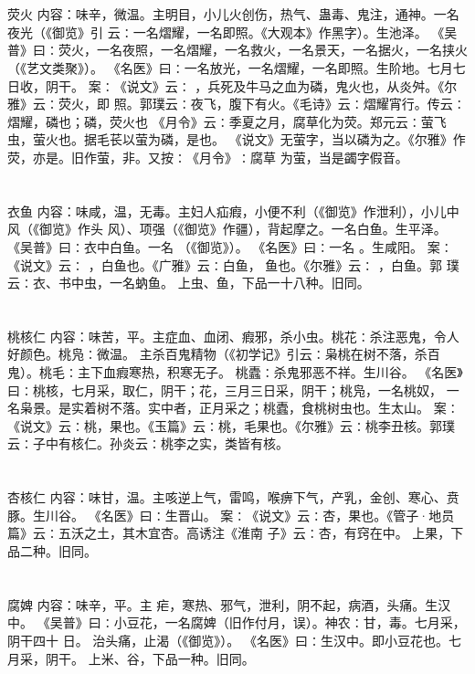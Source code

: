 \documentclass[12pt,UTF8]{ctexbook}
\begin{document}
\section{}荧火
内容：味辛，微温。主明目，小儿火创伤，热气、蛊毒、鬼注，通神。一名夜光（《御览》引 
云∶一名熠耀，一名即照。《大观本》作黑字）。生池泽。 
《吴普》曰∶荧火，一名夜照，一名熠耀，一名救火，一名景天，一名据火，一名挟火 
（《艺文类聚》）。 
《名医》曰∶一名放光，一名熠耀，一名即照。生阶地。七月七日收，阴干。 
案∶《说文》云∶ ，兵死及牛马之血为磷，鬼火也，从炎舛。《尔雅》云∶荧火，即 
照。郭璞云∶夜飞，腹下有火。《毛诗》云∶熠耀宵行。传云∶熠耀，磷也；磷，荧火也 
《月令》云∶季夏之月，腐草化为荧。郑元云∶萤飞虫，萤火也。据毛苌以萤为磷，是也。 
《说文》无萤字，当以磷为之。《尔雅》作荧，亦是。旧作萤，非。又按∶《月令》∶腐草 
为萤，当是蠲字假音。 


\section{}衣鱼
内容：味咸，温，无毒。主妇人疝瘕，小便不利（《御览》作泄利），小儿中风（《御览》作头 
风）、项强（《御览》作疆），背起摩之。一名白鱼。生平泽。 
《吴普》曰∶衣中白鱼。一名 （《御览》）。 
《名医》曰∶一名 。生咸阳。 
案∶《说文》云∶ ，白鱼也。《广雅》云∶白鱼， 鱼也。《尔雅》云∶ ，白鱼。郭 
璞云∶衣、书中虫，一名蚋鱼。 
上虫、鱼，下品一十八种。旧同。 


\section{}桃核仁
内容：味苦，平。主症血、血闭、瘕邪，杀小虫。桃花∶杀注恶鬼，令人好颜色。桃凫∶微温。 
主杀百鬼精物（《初学记》引云∶枭桃在树不落，杀百鬼）。桃毛∶主下血瘕寒热，积寒无子。 
桃蠹∶杀鬼邪恶不祥。生川谷。 
《名医》曰∶桃核，七月采，取仁，阴干；花，三月三日采，阴干；桃凫，一名桃奴， 
一名枭景。是实着树不落。实中者，正月采之；桃蠹，食桃树虫也。生太山。 
案∶《说文》云∶桃，果也。《玉篇》云∶桃，毛果也。《尔雅》云∶桃李丑核。郭璞 
云∶子中有核仁。孙炎云∶桃李之实，类皆有核。 


\section{}杏核仁
内容：味甘，温。主咳逆上气，雷鸣，喉痹下气，产乳，金创、寒心、贲豚。生川谷。 
《名医》曰∶生晋山。 
案∶《说文》云∶杏，果也。《管子·地员篇》云∶五沃之土，其木宜杏。高诱注《淮南 
子》云∶杏，有窍在中。 
上果，下品二种。旧同。 


\section{}腐婢
内容：味辛，平。主 疟，寒热、邪气，泄利，阴不起，病酒，头痛。生汉中。 
《吴普》曰∶小豆花，一名腐婢（旧作付月，误）。神农∶甘，毒。七月采，阴干四十 
日。 
治头痛，止渴（《御览》）。 
《名医》曰∶生汉中。即小豆花也。七月采，阴干。 
上米、谷，下品一种。旧同。 
\end{document}
